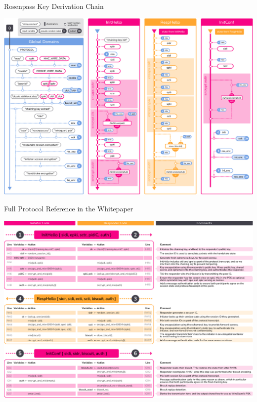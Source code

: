\begin{frame}{Rosenpass Key Derivation Chain}
  \hypertarget{the-rosenpass-protocol-4}{}
  \centering

    \includegraphics[height=.85\textheight]{graphics/rosenpass-wp-hashing-tree-rgb.pdf}
\end{frame}

\begin{frame}{Full Protocol Reference in the Whitepaper}
\hypertarget{the-rosenpass-protocol-3}{}
\centering

 \includegraphics[height=.85\textheight]{graphics/rosenpass-wp-message-handling-code-rgb.pdf}

\end{frame}

